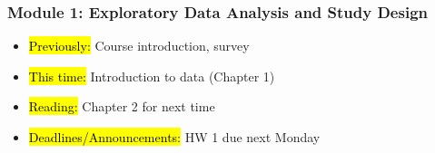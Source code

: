 
\begin{frame}
    \frametitle{Module 1: Exploratory Data Analysis and Study Design}
    \begin{itemize}
        \item \hl{Previously: }Course introduction, survey
        \item \hl{This time: }Introduction to data (Chapter 1)
        \item \hl{Reading: }Chapter 2 for next time
        \item \hl{Deadlines/Announcements: }HW 1 due next Monday
    \end{itemize}
    
\end{frame}
    